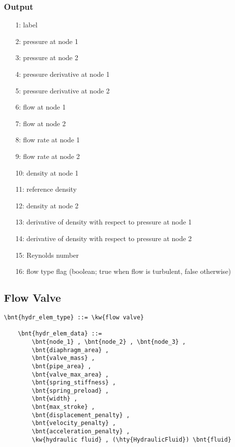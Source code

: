 \subsubsection{Output}
\begin{itemize}
\item[1:] label
\item[2:] pressure at node 1
\item[3:] pressure at node 2
\item[4:] pressure derivative at node 1
\item[5:] pressure derivative at node 2
\item[6:] flow at node 1
\item[7:] flow at node 2
\item[8:] flow rate at node 1
\item[9:] flow rate at node 2
\item[10:] density at node 1
\item[11:] reference density
\item[12:] density at node 2
\item[13:] derivative of density with respect to pressure at node 1
\item[14:] derivative of density with respect to pressure at node 2
\item[15:] Reynolds number
\item[16:] flow type flag (boolean; true when flow is turbulent, false otherwise)
\end{itemize}



\subsection{Flow Valve}
\label{sec:EL:HYDR:FLOW_VALVE}
\begin{Verbatim}[commandchars=\\\{\}]
    \bnt{hydr_elem_type} ::= \kw{flow valve}

    \bnt{hydr_elem_data} ::=
        \bnt{node_1} , \bnt{node_2} , \bnt{node_3} ,
        \bnt{diaphragm_area} ,
        \bnt{valve_mass} ,
        \bnt{pipe_area} ,
        \bnt{valve_max_area} ,
        \bnt{spring_stiffness} ,
        \bnt{spring_preload} ,
        \bnt{width} ,
        \bnt{max_stroke} ,
        \bnt{displacement_penalty} ,
        \bnt{velocity_penalty} ,
        \bnt{acceleration_penalty} ,
        \kw{hydraulic fluid} , (\hty{HydraulicFluid}) \bnt{fluid}
\end{Verbatim}

